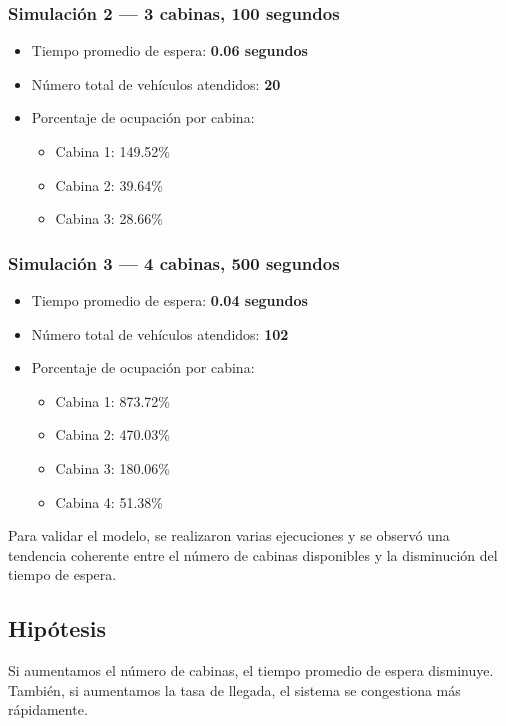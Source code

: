 \documentclass[12pt]{article}
\begin{document}
\subsubsection*{Simulación 2 — 3 cabinas, 100 segundos}
\begin{itemize}
    \item Tiempo promedio de espera: \textbf{0.06 segundos}
    \item Número total de vehículos atendidos: \textbf{20}
    \item Porcentaje de ocupación por cabina:
    \begin{itemize}
        \item Cabina 1: 149.52\%
        \item Cabina 2: 39.64\%
        \item Cabina 3: 28.66\%
    \end{itemize}
\end{itemize}

\subsubsection*{Simulación 3 — 4 cabinas, 500 segundos}
\begin{itemize}
    \item Tiempo promedio de espera: \textbf{0.04 segundos}
    \item Número total de vehículos atendidos: \textbf{102}
    \item Porcentaje de ocupación por cabina:
    \begin{itemize}
        \item Cabina 1: 873.72\%
        \item Cabina 2: 470.03\%
        \item Cabina 3: 180.06\%
        \item Cabina 4: 51.38\%
    \end{itemize}
\end{itemize}
Para validar el modelo, se realizaron varias ejecuciones y se observó una tendencia coherente entre el número de cabinas disponibles y la disminución del tiempo de espera.

\subsection*{Hipótesis}
Si aumentamos el número de cabinas, el tiempo promedio de espera disminuye. También, si aumentamos la tasa de llegada, el sistema se congestiona más rápidamente.
\end{document}

